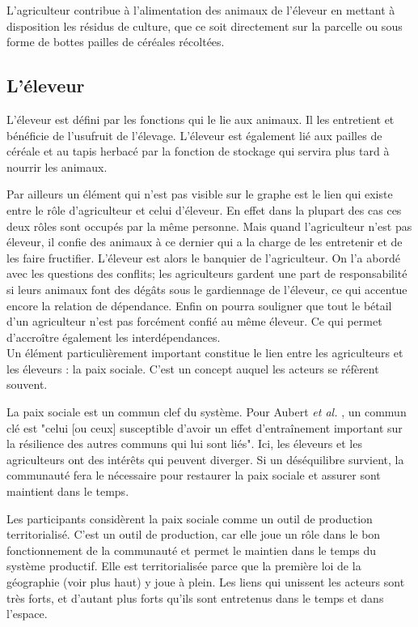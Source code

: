 L'agriculteur contribue à l'alimentation des animaux de l'éleveur en mettant à disposition les résidus de culture, que ce soit directement sur la parcelle ou sous forme de bottes pailles de céréales récoltées.

\subsection{L'éleveur}
L'éleveur est défini par les fonctions qui le lie aux animaux. Il les entretient et bénéficie de l'usufruit de l'élevage. L'éleveur est également lié aux pailles de céréale et au tapis herbacé par la fonction de stockage qui servira plus tard à nourrir les animaux.

Par ailleurs un élément qui n'est pas visible sur le graphe est le lien qui existe entre le rôle d'agriculteur et celui d'éleveur. En effet dans la plupart des cas ces deux rôles sont occupés par la même personne. Mais quand l'agriculteur n'est pas éleveur, il confie des animaux à ce dernier qui a la charge de les entretenir et de les faire fructifier. L'éleveur est alors le banquier de l'agriculteur. On l'a abordé avec les questions des conflits; les agriculteurs gardent une part de responsabilité si leurs animaux font des dégâts sous le gardiennage de l'éleveur, ce qui accentue encore la relation de dépendance. Enfin on pourra souligner que tout le bétail d'un agriculteur n'est pas forcément confié au même éleveur. Ce qui permet d'accroître également les interdépendances.\\

Un élément particulièrement important constitue le lien entre les agriculteurs et les éleveurs : la paix sociale. C'est un concept auquel les acteurs se réfèrent souvent.

La paix sociale est un commun clef du système. Pour Aubert \textit{et al.} \cite{land_tenure_and_development_technical_committee_opportunities_2017}, un commun clé est "celui [ou ceux] susceptible d’avoir un effet d’entraînement important sur la résilience des autres communs qui lui sont liés". Ici, les éleveurs et les agriculteurs ont des intérêts qui peuvent diverger. Si un déséquilibre survient, la communauté fera le nécessaire pour restaurer la paix sociale et assurer sont maintient dans le temps.

Les participants considèrent la paix sociale comme un outil de production territorialisé. C'est un outil de production, car elle joue un rôle dans le bon fonctionnement de la communauté et permet le maintien dans le temps du système productif. Elle est territorialisée parce que la première loi de la géographie (voir plus haut) y joue à plein. Les liens qui unissent les acteurs sont très forts, et d'autant plus forts qu'ils sont entretenus dans le temps et dans l'espace.

